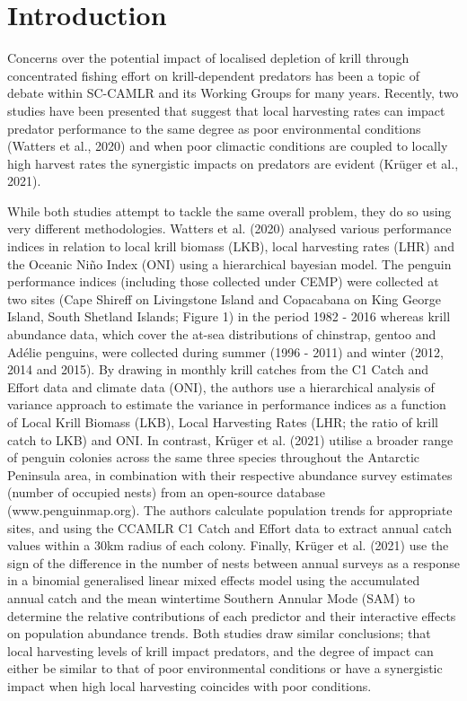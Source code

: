 \documentclass[]{elsarticle} %
\begin{document}
\hypertarget{introduction}{%
\section{Introduction}\label{introduction}}

Concerns over the potential impact of localised depletion of krill
through concentrated fishing effort on krill-dependent predators has
been a topic of debate within SC-CAMLR and its Working Groups for many
years. Recently, two studies have been presented that suggest that local
harvesting rates can impact predator performance to the same degree as
poor environmental conditions (Watters et al., 2020) and when poor
climactic conditions are coupled to locally high harvest rates the
synergistic impacts on predators are evident (Krüger et al., 2021).

While both studies attempt to tackle the same overall problem, they do
so using very different methodologies. Watters et al. (2020) analysed
various performance indices in relation to local krill biomass (LKB),
local harvesting rates (LHR) and the Oceanic Niño Index (ONI) using a
hierarchical bayesian model. The penguin performance indices (including
those collected under CEMP) were collected at two sites (Cape Shireff on
Livingstone Island and Copacabana on King George Island, South Shetland
Islands; Figure 1) in the period 1982 - 2016 whereas krill abundance
data, which cover the at-sea distributions of chinstrap, gentoo and
Adélie penguins, were collected during summer (1996 - 2011) and winter
(2012, 2014 and 2015). By drawing in monthly krill catches from the C1
Catch and Effort data and climate data (ONI), the authors use a
hierarchical analysis of variance approach to estimate the variance in
performance indices as a function of Local Krill Biomass (LKB), Local
Harvesting Rates (LHR; the ratio of krill catch to LKB) and ONI. In
contrast, Krüger et al. (2021) utilise a broader range of penguin
colonies across the same three species throughout the Antarctic
Peninsula area, in combination with their respective abundance survey
estimates (number of occupied nests) from an open-source database
(www.penguinmap.org). The authors calculate population trends for
appropriate sites, and using the CCAMLR C1 Catch and Effort data to
extract annual catch values within a 30km radius of each colony.
Finally, Krüger et al. (2021) use the sign of the difference in the
number of nests between annual surveys as a response in a binomial
generalised linear mixed effects model using the accumulated annual
catch and the mean wintertime Southern Annular Mode (SAM) to determine
the relative contributions of each predictor and their interactive
effects on population abundance trends. Both studies draw similar
conclusions; that local harvesting levels of krill impact predators, and
the degree of impact can either be similar to that of poor environmental
conditions or have a synergistic impact when high local harvesting
coincides with poor conditions.
\end{document}

